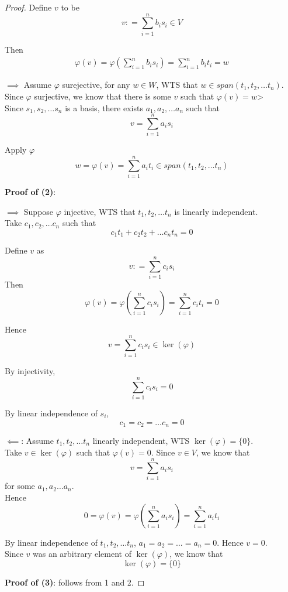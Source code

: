 \begin{proof}
Define $v$ to be 
\[
    v : = \sum\limits_{i = 1}^{n} b_i s_i \in V
\]

Then 
\begin{align*}
    \varphi(v) = \varphi \left( \sum\limits_{ i = 1}^{n} b_i s_i \right)  = \sum\limits_{i = 1}^{n} b_i t_i = w
\end{align*}

$\implies$ Assume $\varphi$ surejective, for any $w \in W$, WTS that $w \in span \left( t_1, t_2, \hdots t_n \right) $. \\

Since $\varphi$ surjective, we know that there is some $v$ such that $\varphi(v) = w$> \\

Since $s_1, s_2, \hdots s_n$ is a basis, there exists $a_1, a_2, \hdots a_n$ such that 
\[
    v = \sum\limits_{i = 1}^{n} a_i s_i
\]

Apply $\varphi$
\[
    w = \varphi(v) = \sum\limits_{i =1 }^{n} a_i t_i \in span \left( t_1, t_2, \hdots t_n \right) 
\]

\textbf{Proof of (2)}: 

$\implies$ Suppose $\varphi$ injective, WTS that $t_1, t_2, \hdots t_n$ is linearly independent. \\

Take $c_1, c_2, \hdots c_n$ such that 
\[
    c_1 t_1 + c_2 t_2 + \hdots c_n t_n = 0
\]

Define $v$ as 
\[
    v : = \sum\limits_{i = 1 }^{n}  c_i s_i
\]
Then
\[
    \varphi(v) = \varphi \left( \sum\limits_{i = 1}^{n} c_i s_i \right)  = \sum\limits_{i = 1}^{n} c_i t_i = 0
\]

Hence 
\[
    v = \sum\limits_{i =1}^{n} c_i s_i \in \ker(\varphi)
\]

By injectivity, 
\[
    \sum\limits_{i = 1}^{n} c_i s_i = 0
\]

By linear independence of $s_i$, 
\[
    c_1 = c_2 = \hdots c_n = 0
\]

$\impliedby$: Assume $t_1, t_2, \hdots t_n$ linearly independent, WTS $\ker( \varphi) = \{ 0 \} $. \\

Take $v \in \ker(\varphi)$ such that $\varphi(v) = 0$. Since $v \in V$, we know that 
\[
    v = \sum\limits_{i = 1}^{n} a_i s_i
\]
for some $a_1, a_2 \hdots a_n$. \\

Hence
\[
    0 = \varphi(v) = \varphi \left( \sum\limits_{i = 1}^{n} a_i s_i \right)  = \sum\limits_{i = 1}^{n} a_i t_i
\]

By linear independence of $t_1, t_2, \hdots t_n$, $a_1 = a_2 = \hdots = a_n = 0$. Hence $v = 0$. \\

Since $v$ was an arbitrary element of $\ker( \varphi)$, we know that 
\[
    \ker(\varphi) = \{  0 \} 
\]

\textbf{Proof of (3)}: follows from 1 and 2.
\end{proof}

